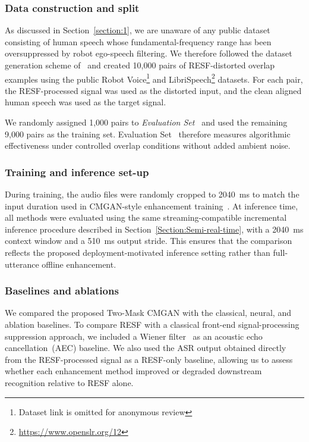 \documentclass[manuscript,screen,review]{acmart}
\newcommand{\RomanNumeralCaps}[1]
    {\MakeUppercase{\romannumeral #1}}
\begin{document}
\subsubsection{Data construction and split}
\label{sec:eval1_data}

As discussed in Section~\ref{section:1}, we are unaware of any public dataset consisting of human speech whose fundamental-frequency range has been oversuppressed by robot ego-speech filtering. We therefore followed the dataset generation scheme of~\cite{Li_2024} and created 10,000 pairs of RESF-distorted overlap examples using the public Robot Voice\footnote{Dataset link is omitted for anonymous review} and LibriSpeech\footnote{\url{https://www.openslr.org/12}} datasets. For each pair, the RESF-processed signal was used as the distorted input, and the clean aligned human speech was used as the target signal.

We randomly assigned 1,000 pairs to \textit{Evaluation Set~\RomanNumeralCaps{1}} and used the remaining 9,000 pairs as the training set. Evaluation Set~\RomanNumeralCaps{1} therefore measures algorithmic effectiveness under controlled overlap conditions without added ambient noise.

\subsubsection{Training and inference set-up}
\label{sec:eval1_setup}

During training, the audio files were randomly cropped to 2040~ms to match the input duration used in CMGAN-style enhancement training~\cite{cao2022cmgan}. At inference time, all methods were evaluated using the same streaming-compatible incremental inference procedure described in Section~\ref{Section:Semi-real-time}, with a 2040~ms context window and a 510~ms output stride. This ensures that the comparison reflects the proposed deployment-motivated inference setting rather than full-utterance offline enhancement.

\subsubsection{Baselines and ablations}
\label{sec:eval1_baselines}

We compared the proposed Two-Mask CMGAN with the classical, neural, and ablation baselines. To compare RESF with a classical front-end signal-processing suppression approach, we included a Wiener filter~\cite{enzner2006frequency} as an acoustic echo cancellation~(AEC) baseline. We also used the ASR output obtained directly from the RESF-processed signal as a RESF-only baseline, allowing us to assess whether each enhancement method improved or degraded downstream recognition relative to RESF alone.
\end{document}
